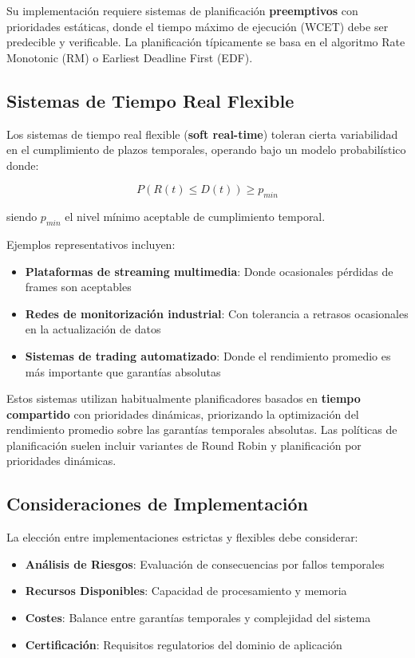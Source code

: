     Su implementación requiere sistemas de planificación \textbf{preemptivos} con prioridades estáticas, donde el tiempo máximo de ejecución (WCET) debe ser predecible y verificable. La planificación típicamente se basa en el algoritmo Rate Monotonic (RM) o Earliest Deadline First (EDF).

    \newpage
    \subsection{Sistemas de Tiempo Real Flexible}
        Los sistemas de tiempo real flexible (\textbf{soft real-time}) toleran cierta variabilidad en el cumplimiento de plazos temporales, operando bajo un modelo probabilístico donde:

        \begin{equation}
        P(R(t) \leq D(t)) \geq p_{min}
        \end{equation}

        siendo $p_{min}$ el nivel mínimo aceptable de cumplimiento temporal.

        Ejemplos representativos incluyen:
        \begin{itemize}
            \item \textbf{Plataformas de streaming multimedia}: Donde ocasionales pérdidas de frames son aceptables
            \item \textbf{Redes de monitorización industrial}: Con tolerancia a retrasos ocasionales en la actualización de datos
            \item \textbf{Sistemas de trading automatizado}: Donde el rendimiento promedio es más importante que garantías absolutas
        \end{itemize}

        Estos sistemas utilizan habitualmente planificadores basados en \textbf{tiempo compartido} con prioridades dinámicas, priorizando la optimización del rendimiento promedio sobre las garantías temporales absolutas. Las políticas de planificación suelen incluir variantes de Round Robin y planificación por prioridades dinámicas.

    \subsection{Consideraciones de Implementación}
        La elección entre implementaciones estrictas y flexibles debe considerar:
        \begin{itemize}
            \item \textbf{Análisis de Riesgos}: Evaluación de consecuencias por fallos temporales
            \item \textbf{Recursos Disponibles}: Capacidad de procesamiento y memoria
            \item \textbf{Costes}: Balance entre garantías temporales y complejidad del sistema
            \item \textbf{Certificación}: Requisitos regulatorios del dominio de aplicación
        \end{itemize}


